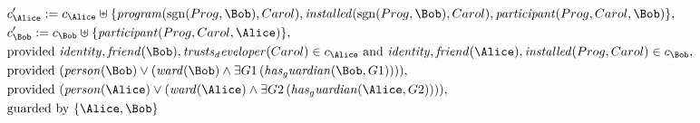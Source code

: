 \begin{align*}
&
c'_
{
\Alice
}
 := 
c_
{
\Alice
}
 \uplus 
\{
\mathit{
program
}
(
\mathrm{sgn}(
Prog
,
\Bob
)
,
Carol
)
,
\mathit{
installed
}
(
\mathrm{sgn}(
Prog
,
\Bob
)
,
Carol
)
,
\mathit{
participant
}
(
Prog
,
Carol
,
\Bob
)
\}
,\\
&
c'_
{
\Bob
}
 := 
c_
{
\Bob
}
 \uplus 
\{
\mathit{
participant
}
(
Prog
,
Carol
,
\Alice
)
\}
,\\
&
\text{provided } 
\mathit{
identity
}
,
\mathit{
friend
}
(
\Bob
)
,
\mathit{
trusts_developer
}
(
Carol
)
 \in c_
{
\Alice
}
 \text{ and } 
\mathit{
identity
}
,
\mathit{
friend
}
(
\Alice
)
,
\mathit{
installed
}
(
Prog
,
Carol
)
 \in c_
{
\Bob
}
,\\
&
\text{provided } 
(
\mathit{
person
}
(
\Bob
)
\lor
(
\mathit{
ward
}
(
\Bob
)
\land
\exists 
G1
\,(
\mathit{
has_guardian
}
(
\Bob
,
G1
)
)
)
)
,\\
&
\text{provided } 
(
\mathit{
person
}
(
\Alice
)
\lor
(
\mathit{
ward
}
(
\Alice
)
\land
\exists 
G2
\,(
\mathit{
has_guardian
}
(
\Alice
,
G2
)
)
)
)
,\\
&
\text{guarded by } \{
\Alice
,
\Bob
\}
\end{align*}


